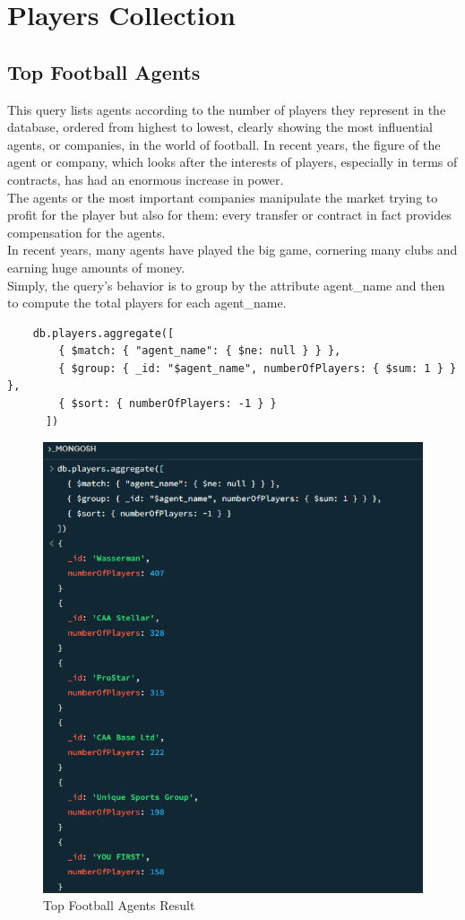 \documentclass{Configuration_Files/PoliMi3i_thesis}
\begin{document}
\section{Players Collection}
\subsection{Top Football Agents}
\label{sec:Top Football Agents}
This query lists agents according to the number of players they represent in the database, ordered from highest to lowest, clearly showing the most influential agents, or companies, in the world of football. In recent years, the figure of the agent or company, which looks after the interests of players, especially in terms of contracts, has had an enormous increase in power. \\
The agents or the most important companies manipulate the market trying to profit for the player but also for them: every transfer or contract in fact provides compensation for the agents.\\
In recent years, many agents have played the big game, cornering many clubs and earning huge amounts of money.\\
Simply, the query’s behavior is to group by the attribute agent\_name and then to compute the total players for each agent\_name.
\begin{verbatim}
    db.players.aggregate([
        { $match: { "agent_name": { $ne: null } } },
        { $group: { _id: "$agent_name", numberOfPlayers: { $sum: 1 } } }, 
        { $sort: { numberOfPlayers: -1 } }
      ])      
    \end{verbatim}
\begin{figure}[htbp]
    \centering
    \includegraphics[scale=0.8]{Images/Queries/Top_Footbal_Agents/agents.png}
    \caption{Top Football Agents Result}
\end{figure}
\end{document}
